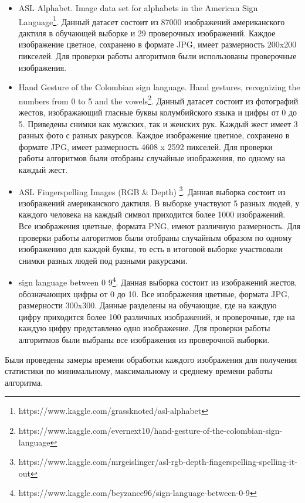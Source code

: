 \begin{itemize}
	\item ASL Alphabet. Image data set for alphabets in the American Sign Language\footnote{https://www.kaggle.com/grassknoted/asl-alphabet}. Данный датасет состоит из 87000 изображений американского дактиля в обучающей выборке и 29 проверочных изображений. Каждое изображение цветное, сохранено в формате JPG, имеет размерность 200x200 пикселей. Для проверки работы алгоритмов были использованы проверочные изображения.
	
	\item Hand Gesture of the Colombian sign language. Hand gestures, recognizing the numbers from 0 to 5 and the vowels\footnote{https://www.kaggle.com/evernext10/hand-gesture-of-the-colombian-sign-language}. Данный датасет состоит из фотографий жестов, изображающий гласные буквы колумбийского языка и цифры от 0 до 5. Приведены снимки как мужских, так и женских рук. Каждый жест имеет 3 разных фото с разных ракурсов. Каждое изображение цветное, сохранено в формате JPG, имеет размерность 4608 x 2592 пикселей. Для проверки работы алгоритмов были отобраны случайные изображения, по одному на каждый жест.
	
	\item ASL Fingerspelling Images (RGB \& Depth) \footnote{https://www.kaggle.com/mrgeislinger/asl-rgb-depth-fingerspelling-spelling-it-out}. Данная выборка состоит из изображений американского дактиля. В выборке участвуют 5 разных людей, у каждого человека на каждый символ приходится более 1000 изображений. Все изображения цветные, формата PNG, имеют различную размерность. Для проверки работы алгоритмов были отобраны случайным образом по одному изображению для каждой буквы, то есть в итоговой выборке участвовали снимки разных людей под разными ракурсами.
	
	\item sign language between 0 9\footnote{https://www.kaggle.com/beyzance96/sign-language-between-0-9}. Данная выборка состоит из изображений жестов, обозначающих цифры от 0 до 10. Все изображения цветные, формата JPG, размерности 300x300. Данные разделены на обучающие, где на каждую цифру приходится более 100 различных изображений, и проверочные, где на каждую цифру представлено одно изображение. Для проверки работы алгоритмов были выбраны все изображения из проверочной выборки. 
	
\end{itemize}

 Были проведены замеры времени обработки каждого изображения для получения статистики по минимальному, максимальному и среднему времени работы алгоритма.